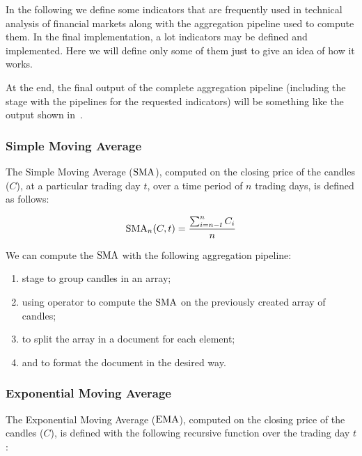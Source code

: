 In the following we define some indicators that are frequently used in technical
analysis of financial markets along with the aggregation pipeline used to
compute them. In the final implementation, a lot indicators may be defined and
implemented. Here we will define only some of them just to give an idea of how
it works.

At the end, the final output of the complete aggregation pipeline (including the
 stage with the pipelines for the requested indicators) will be
something like the output shown in~.



\subsubsection{Simple Moving Average}

The Simple Moving Average (\(\operatorname{SMA}\)), computed on the closing price of the
candles (\(C\)), at a particular trading day \(t\), over a time period of \(n\)
trading days, is defined as follows:

\begin{equation}\label{eq:sma}
	\operatorname{SMA}_n(C,t) = \frac{\sum_{i = n - t}^n C_i}{n}
\end{equation}

We can compute the \(\operatorname{SMA}\) with the following aggregation pipeline:

\begin{enumerate}
	\item {} stage to group candles in an array;
	\item {} using  operator to compute the
		\(\operatorname{SMA}\) on the previously created array of candles;
	\item {} to split the array in a document for each element;
	\item {} and  to format the document
		in the desired way.
\end{enumerate}

\subsubsection{Exponential Moving Average}

The Exponential Moving Average (\(\operatorname{EMA}\)), computed on the closing price of the
candles (\(C\)), is defined with the following recursive function over the
trading day \(t\):

